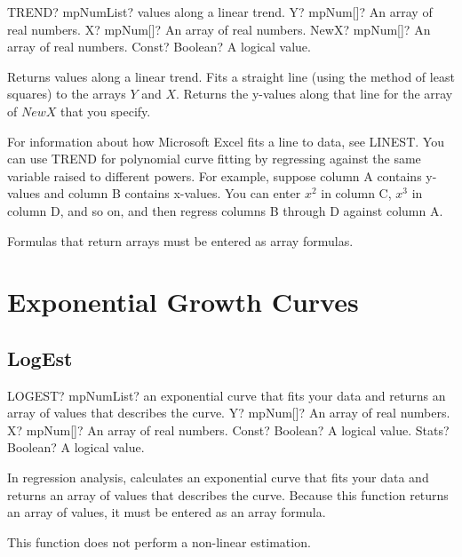 \begin{mpFunctionsExtract}
	\mpWorksheetFunctionFourNotImplemented
	{TREND? mpNumList? values along a linear trend.}
	{Y? mpNum[]? An array of real numbers.}
	{X? mpNum[]? An array of real numbers.}
	{NewX? mpNum[]? An array of real numbers.}
	{Const? Boolean? A logical value.}
\end{mpFunctionsExtract}

\vspace{0.3cm}
Returns values along a linear trend. Fits a straight line (using the method of least squares) to the arrays $Y$ and $X$. Returns the y-values along that line for the array of $NewX$ that you specify.

For information about how Microsoft Excel fits a line to data, see LINEST.
You can use TREND for polynomial curve fitting by regressing against the same variable raised to different powers. For example, suppose column A contains y-values and column B contains x-values. You can enter $x^2$ in column C, $x^3$ in column D, and so on, and then regress columns B through D against column A.

Formulas that return arrays must be entered as array formulas.



\newpage
\section{Exponential Growth Curves}

\subsection{LogEst}

\begin{mpFunctionsExtract}
	\mpWorksheetFunctionFourNotImplemented
	{LOGEST? mpNumList? an exponential curve that fits your data and returns an array of values that describes the curve.}
	{Y? mpNum[]? An array of real numbers.}
	{X? mpNum[]? An array of real numbers.}
	{Const? Boolean? A logical value.}
	{Stats? Boolean? A logical value.}
\end{mpFunctionsExtract}

\vspace{0.3cm}
In regression analysis, calculates an exponential curve that fits your data and returns an array of values that describes the curve. Because this function returns an array of values, it must be entered as an array formula.

This function does not perform a non-linear estimation.



